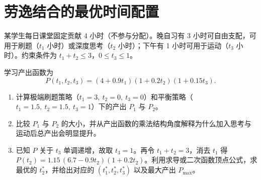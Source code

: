 \documentclass[10pt]{article}
\begin{document}
\section{劳逸结合的最优时间配置}

某学生每日课堂固定贡献 4 小时（不参与分配）。晚自习有 3 小时可自由支配，可用于刷题（$t_1$ 小时）或深度思考（$t_2$ 小时）；下午有 1 小时可用于运动（$t_3$ 小时）。约束条件为 $t_1+t_2\le 3$，$0\le t_3\le 1$。

学习产出函数为
$$
P(t_1,t_2,t_3)=(4+0.9t_1)(1+0.2t_2)(1+0.15t_3).
$$

\begin{enumerate}[label=(\arabic*)]
\item 计算极端刷题策略（$t_1=3,\ t_2=0,\ t_3=0$）和平衡策略（$t_1=1.5,\ t_2=1.5,\ t_3=1$）下的产出 $P_1$ 与 $P_2$。

\item 比较 $P_1$ 与 $P_2$ 的大小，并从产出函数的乘法结构角度解释为什么加入思考与运动后总产出会明显提升。

\item 已知 $P$ 关于 $t_3$ 单调递增，故取 $t_3=1$。再令 $t_1+t_2=3$，消去 $t_1$ 得 $P(t_2)=1.15\,(6.7-0.9t_2)(1+0.2t_2)$。利用求导或二次函数顶点公式，求最优的 $t_2^*$，并给出对应的 $(t_1^*,t_2^*,t_3^*)$ 以及最大产出 $P_{\max}$。
\end{enumerate}
\end{document}
